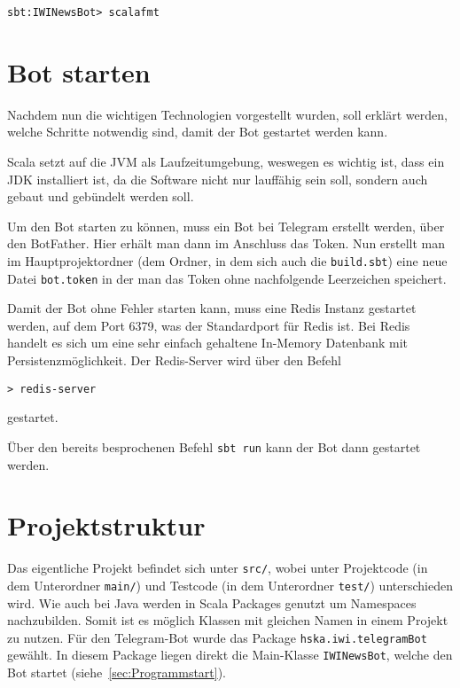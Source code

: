 \begin{lstlisting}
sbt:IWINewsBot> scalafmt
\end{lstlisting}

\section{Bot starten}
Nachdem nun die wichtigen Technologien vorgestellt wurden, soll erklärt werden, welche Schritte notwendig sind, damit der Bot gestartet werden kann.

Scala setzt auf die JVM als Laufzeitumgebung, weswegen es wichtig ist, dass ein JDK installiert ist, da die Software nicht nur lauffähig sein soll, sondern auch gebaut und gebündelt werden soll.

Um den Bot starten zu können, muss ein Bot bei Telegram erstellt werden, über den BotFather. Hier erhält man dann im Anschluss das Token. Nun erstellt man im Hauptprojektordner (dem Ordner, in dem sich auch die \texttt{build.sbt}) eine neue Datei \texttt{bot.token} in der man das Token ohne nachfolgende Leerzeichen speichert.

Damit der Bot ohne Fehler starten kann, muss eine Redis Instanz gestartet werden, auf dem Port 6379, was der Standardport für Redis ist. Bei Redis handelt es sich um eine sehr einfach gehaltene In-Memory Datenbank mit Persistenzmöglichkeit. Der Redis-Server wird über den Befehl

\begin{lstlisting}
> redis-server
\end{lstlisting}

gestartet.

Über den bereits besprochenen Befehl \texttt{sbt run} kann der Bot dann gestartet werden.

\section{Projektstruktur}
Das eigentliche Projekt befindet sich unter \texttt{src/}, wobei unter Projektcode (in dem Unterordner \texttt{main/}) und Testcode (in dem Unterordner \texttt{test/}) unterschieden wird. Wie auch bei Java werden in Scala Packages genutzt um Namespaces nachzubilden. Somit ist es möglich Klassen mit gleichen Namen in einem Projekt zu nutzen. Für den Telegram-Bot wurde das Package \texttt{hska.iwi.telegramBot} gewählt. In diesem Package liegen direkt die Main-Klasse \texttt{IWINewsBot}, welche den Bot startet (siehe~\autoref{sec:Programmstart}).

